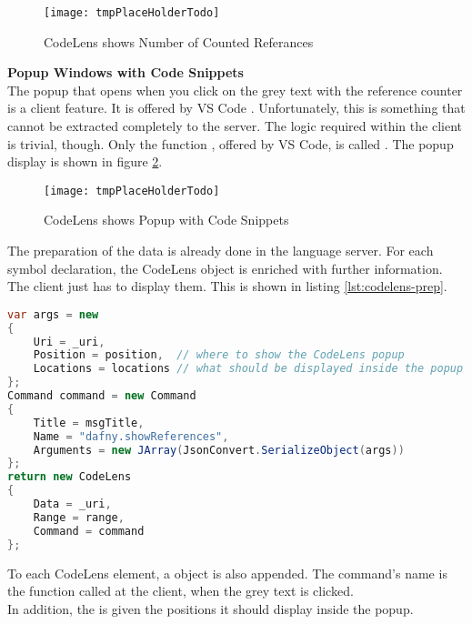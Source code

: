 \begin{figure}[H]
    \centering
    \texttt{[image: tmpPlaceHolderTodo]}
    \caption{CodeLens shows Number of Counted Referances}
    \label{fig:codelens_show_ref_number}
\end{figure}

\textbf{Popup Windows with Code Snippets} \\
The popup that opens when you click on the grey text
with the reference counter is a client feature.
It is offered by VS Code \cite{vscodeAPI}.
Unfortunately, this is something that cannot be extracted completely to the server.
The logic required within the client is trivial, though.
Only the function ,
offered by VS Code, is called \cite{vscodeAPI}.
The popup display is shown in figure \ref{fig:codelens_show_popup}. \\

\begin{figure}[H]
    \centering
    \texttt{[image: tmpPlaceHolderTodo]}
    \caption{CodeLens shows Popup with Code Snippets}
    \label{fig:codelens_show_popup}
\end{figure}

The preparation of the data is already done in the language server.
For each symbol declaration, the CodeLens object is enriched with further information.
The client just has to display them.
This is shown in listing \ref{lst:codelens-prep}.

\begin{lstlisting}[language=csharp, caption={LSP Handler Implementation}, captionpos=b, label={lst:codelens-prep}]
var args = new
{
    Uri = _uri,
    Position = position,  // where to show the CodeLens popup
    Locations = locations // what should be displayed inside the popup
};
Command command = new Command
{
    Title = msgTitle,
    Name = "dafny.showReferences",
    Arguments = new JArray(JsonConvert.SerializeObject(args))
};
return new CodeLens
{
    Data = _uri,
    Range = range,
    Command = command
};
\end{lstlisting}

To each CodeLens element, a  object is also appended.
The command's name is the function called at the client, when the grey text is clicked.\\

In addition, the  is given the positions it should display inside the popup.  \\

